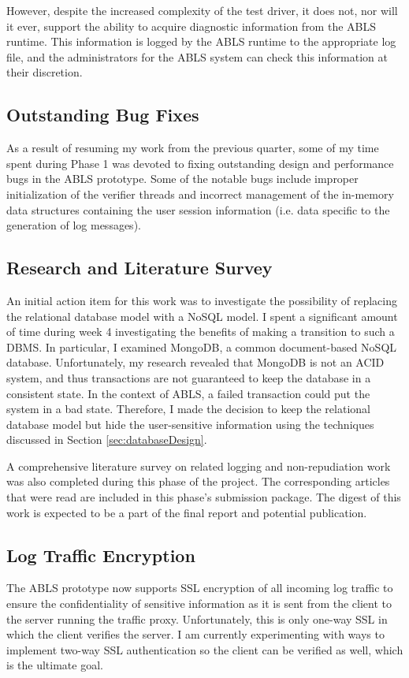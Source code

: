 \documentclass{sig-alternate}
\begin{document}
However, despite the increased complexity of the test driver, it does not, nor will it ever, support the ability to acquire 
diagnostic information from the ABLS runtime. This information is logged by the ABLS runtime to the appropriate log 
file, and the administrators for the ABLS system can check this information at their discretion.


\subsection{Outstanding Bug Fixes}
As a result of resuming my work from the previous quarter, some of my time spent during Phase 1 was devoted to fixing
outstanding design and performance bugs in the ABLS prototype. Some of the notable bugs include improper 
initialization of the verifier threads and incorrect management of the in-memory data structures containing the 
user session information (i.e. data specific to the generation of log messages).

\subsection{Research and Literature Survey}
An initial action item for this work was to investigate the possibility of replacing the relational database model with a 
NoSQL model. I spent a significant amount of time during week 4 investigating the benefits of making a transition
to such a DBMS. In particular, I examined MongoDB, a common document-based NoSQL database. Unfortunately,
my research revealed that MongoDB is not an ACID system, and thus transactions are not guaranteed to keep the
database in a consistent state. In the context of ABLS, a failed transaction could put the system in a bad state. Therefore,
I made the decision to keep the relational database model but hide the user-sensitive information using the techniques
discussed in Section \ref{sec:databaseDesign}.

A comprehensive literature survey on related logging and non-repudiation work was also completed during this phase 
of the project. The corresponding articles that were read are included in this phase's submission package. The digest of this work is expected to be a part of the final report and potential publication.

\subsection{Log Traffic Encryption}
The ABLS prototype now supports SSL encryption of all incoming log traffic to ensure the confidentiality of sensitive
information as it is sent from the client to the server running the traffic proxy. Unfortunately, this is only one-way SSL 
in which the client verifies the server. I am currently experimenting with ways to implement two-way SSL authentication
so the client can be verified as well, which is the ultimate goal. 
\end{document}
